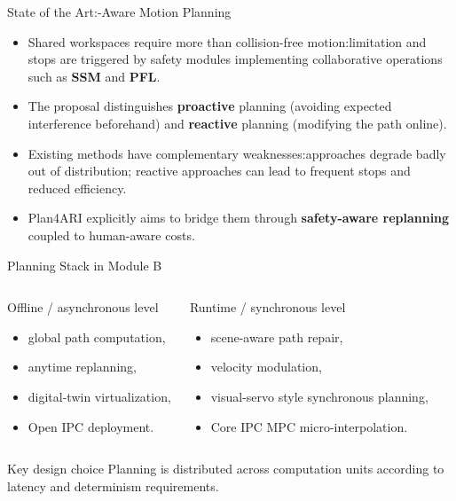 \documentclass[aspectratio=169,10pt]{beamer}
\begin{document}
\begin{frame}{State of the Art:\@Safety-Aware Motion Planning}

\small
\begin{itemize}
  \item Shared workspaces require more than collision-free motion:\@speed limitation and stops are triggered by safety modules implementing collaborative operations such as \textbf{SSM} and \textbf{PFL}.
  \item The proposal distinguishes \textbf{proactive} planning (avoiding expected interference beforehand) and \textbf{reactive} planning (modifying the path online).
  \item Existing methods have complementary weaknesses:\@proactive approaches degrade badly out of distribution; reactive approaches can lead to frequent stops and reduced efficiency.
  \item Plan4ARI explicitly aims to bridge them through \textbf{safety-aware replanning} coupled to human-aware costs.
\end{itemize}

\end{frame}


\begin{frame}{Planning Stack in Module B}

\begin{columns}[T,totalwidth=\textwidth]
\begin{block}{Offline / asynchronous level}
\begin{itemize}
  \item global path computation,
  \item anytime replanning,
  \item digital-twin virtualization,
  \item Open IPC deployment.
\end{itemize}
\end{block}
\begin{block}{Runtime / synchronous level}
\begin{itemize}
  \item scene-aware path repair,
  \item velocity modulation,
  \item visual-servo style synchronous planning,
  \item Core IPC MPC micro-interpolation.
\end{itemize}
\end{block}
\end{columns}
\begin{block}{Key design choice}
Planning is distributed across computation units according to latency and determinism requirements.
\end{block}

\end{frame}
\end{document}
